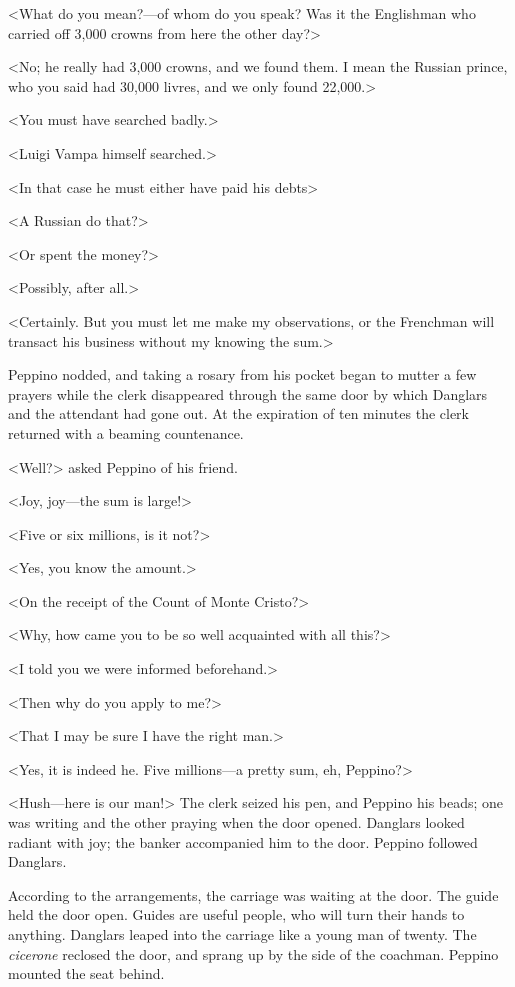  <What do you mean?—of whom do you speak? Was it the Englishman who carried off 3,000 crowns from here the other day?>

<No; he really had 3,000 crowns, and we found them. I mean the Russian prince, who you said had 30,000 livres, and we only found 22,000.> 

 <You must have searched badly.> 

 <Luigi Vampa himself searched.> 

 <In that case he must either have paid his debts\longdash> 

 <A Russian do that?> 

 <Or spent the money?> 

 <Possibly, after all.> 

 <Certainly. But you must let me make my observations, or the Frenchman will transact his business without my knowing the sum.> 

 Peppino nodded, and taking a rosary from his pocket began to mutter a few prayers while the clerk disappeared through the same door by which Danglars and the attendant had gone out. At the expiration of ten minutes the clerk returned with a beaming countenance. 

 <Well?> asked Peppino of his friend. 

 <Joy, joy—the sum is large!> 

 <Five or six millions, is it not?> 

 <Yes, you know the amount.> 

 <On the receipt of the Count of Monte Cristo?> 

 <Why, how came you to be so well acquainted with all this?> 

 <I told you we were informed beforehand.> 

 <Then why do you apply to me?> 

 <That I may be sure I have the right man.> 

 <Yes, it is indeed he. Five millions—a pretty sum, eh, Peppino?> 

 <Hush—here is our man!> The clerk seized his pen, and Peppino his beads; one was writing and the other praying when the door opened. Danglars looked radiant with joy; the banker accompanied him to the door. Peppino followed Danglars. 

 According to the arrangements, the carriage was waiting at the door. The guide held the door open. Guides are useful people, who will turn their hands to anything. Danglars leaped into the carriage like a young man of twenty. The \textit{cicerone} reclosed the door, and sprang up by the side of the coachman. Peppino mounted the seat behind. 

